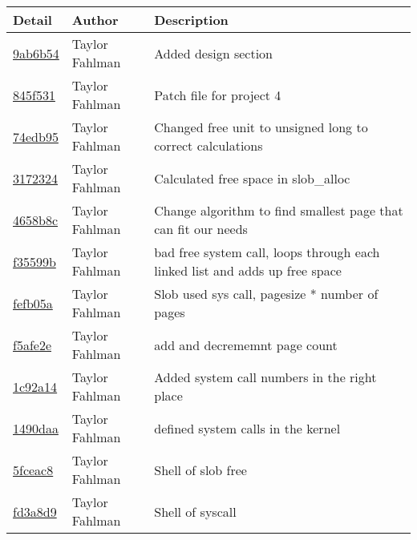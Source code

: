 \begin{tabular}{l l l}\textbf{Detail} & \textbf{Author} & \textbf{Description}\\\hline
\href{https://github.com/fahlmant/cs444/commit/9ab6b54724aa05b43bd97f44ce601107244f2720}{9ab6b54} & Taylor Fahlman & Added design section\\\hline
\href{https://github.com/fahlmant/cs444/commit/845f5318497342c9dcb224272cf2fd6411817907}{845f531} & Taylor Fahlman & Patch file for project 4\\\hline
\href{https://github.com/fahlmant/cs444/commit/74edb95a334ed2c03f204f3897abfa5b93fcd5c4}{74edb95} & Taylor Fahlman & Changed free unit to unsigned long to correct calculations\\\hline
\href{https://github.com/fahlmant/cs444/commit/317232474c9d8d4ee3d9cf9723015378672d901f}{3172324} & Taylor Fahlman & Calculated free space in slob_alloc\\\hline
\href{https://github.com/fahlmant/cs444/commit/4658b8c1cd4a1fb9ce30d2f21bce4c33abec0568}{4658b8c} & Taylor Fahlman & Change algorithm to find smallest page that can fit our needs\\\hline
\href{https://github.com/fahlmant/cs444/commit/f35599ba0122031a0f2174661e94be0e8aa1549f}{f35599b} & Taylor Fahlman & bad free system call, loops through each linked list and adds up free space\\\hline
\href{https://github.com/fahlmant/cs444/commit/fefb05a436e36ad3318878fc9d80459ce9a297e4}{fefb05a} & Taylor Fahlman & Slob used sys call, pagesize * number of pages\\\hline
\href{https://github.com/fahlmant/cs444/commit/f5afe2e87e38baebb3a404d318ce94c6e567e0c2}{f5afe2e} & Taylor Fahlman & add and decrememnt page count\\\hline
\href{https://github.com/fahlmant/cs444/commit/1c92a14db9ebe371b478c12d03e6d2efb378697d}{1c92a14} & Taylor Fahlman & Added system call numbers in the right place\\\hline
\href{https://github.com/fahlmant/cs444/commit/1490daa5fff5111ef989e2bbb8fb96ac9abaf8fd}{1490daa} & Taylor Fahlman & defined system calls in the kernel\\\hline
\href{https://github.com/fahlmant/cs444/commit/5fceac830d786b181830efcc7fb2d6e9bdf244c8}{5fceac8} & Taylor Fahlman & Shell of slob free\\\hline
\href{https://github.com/fahlmant/cs444/commit/fd3a8d9278138089028970d171e9bcc471f6f6de}{fd3a8d9} & Taylor Fahlman & Shell of syscall\\\hline

\end{tabular}
